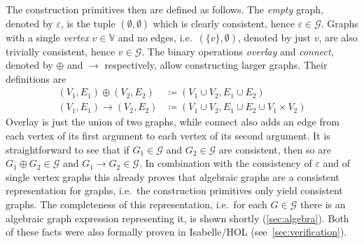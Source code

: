 \documentclass{article}
\renewcommand{\epsilon}{\varepsilon}
\newcommand{\eps}{\epsilon}
\newcommand{\overlay}{\oplus}
\newcommand{\connect}{\rightarrow}
\begin{document}
The construction primitives
then are defined as follows. The \textit{empty} graph, denoted by $\eps$, is
the tuple $(\emptyset, \emptyset)$ which is clearly consistent, hence
$\eps \in \mathcal{G}$. Graphs with a single \textit{vertex} $v \in
\mathbb{V}$ and no edges, i.e.\ $(\{v\}, \emptyset)$, denoted by just $v$, are also
trivially consistent, hence $v \in \mathcal{G}$. The binary operations
\textit{overlay} and \textit{connect}, denoted by $\overlay$ and $\connect$
respectively, allow constructing larger graphs. Their definitions are
\begin{align*}
  (V_1, E_1) \overlay (V_2, E_2) &\coloneqq (V_1 \cup V_2, E_1 \cup E_2)\\
  (V_1, E_1) \connect (V_2, E_2) &\coloneqq (V_1 \cup V_2, E_1 \cup E_2 \cup V_1 \times V_2)
\end{align*}
Overlay is just the union of two graphs, while connect also adds an edge from
each vertex of its first argument to each vertex of its second argument. It is
straightforward to see that if $G_1 \in \mathcal{G}$ and $G_2 \in \mathcal{G}$
are consistent, then so are $G_1 \overlay G_2 \in \mathcal{G}$ and $G_1 \connect
G_2 \in \mathcal{G}$. In combination with the consistency of $\eps$ and of single vertex
graphs this already proves that algebraic graphs are a consistent
representation for graphs, i.e.\ the construction primitives only yield
consistent graphs. The completeness of this representation, i.e.\ for
each $G \in \mathcal{G}$ there is an algebraic graph expression representing it,
is shown shortly (\ref{sec:algebra}). Both of these facts were also formally proven in
Isabelle/HOL (see~\autoref{sec:verification}).
\end{document}
